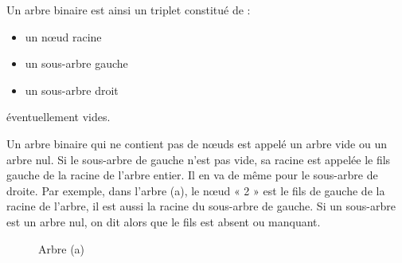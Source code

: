 \documentclass{report}
\begin{document}
Un arbre binaire est ainsi un triplet constitué de :
\begin{itemize}
\item un nœud racine
\item un sous-arbre gauche
\item un sous-arbre droit
\end{itemize}
éventuellement vides.

Un arbre binaire qui ne contient pas de nœuds est appelé un arbre vide ou un arbre nul.
Si le sous-arbre de gauche n'est pas vide, sa racine est appelée le fils gauche de la racine de l'arbre entier. Il en va de même pour le sous-arbre de droite.
Par exemple, dans l'arbre (a), le nœud « 2 » est le fils de gauche de la racine de l'arbre, il est aussi la racine du sous-arbre de gauche.
Si un sous-arbre est un arbre nul, on dit alors que le fils est absent ou manquant.
\begin{figure}[h]
\begin{center}
\end{center}
\caption{Arbre (a)} \label{fig:Exemples d'arbres}
\end{figure}
\end{document}
